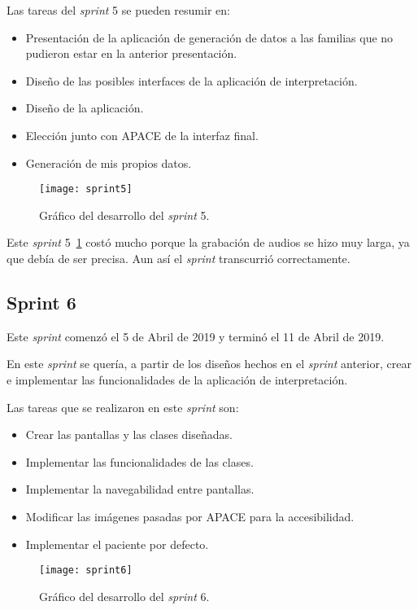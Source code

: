 Las tareas del \textit{sprint} 5 se pueden resumir en:
\begin{itemize}
	\item Presentación de la aplicación de generación de datos a las familias que no pudieron estar en la anterior presentación.
	\item Diseño de las posibles interfaces de la aplicación de interpretación.
	\item Diseño de la aplicación.
	\item Elección junto con APACE de la interfaz final.
	\item Generación de mis propios datos.
\end{itemize}

\begin{figure}
	\centering
	\texttt{[image: sprint5]}
	\caption{Gráfico del desarrollo del \textit{sprint} 5.}
	\label{fig:sprint5}
\end{figure}

Este \textit{sprint} 5~\ref{fig:sprint5} costó mucho porque la grabación de audios se hizo muy larga, ya que debía de ser precisa. Aun así el \textit{sprint} transcurrió correctamente.

\subsection{Sprint 6}
Este \textit{sprint} comenzó el 5 de Abril de 2019 y terminó el 11 de Abril de 2019.

En este \textit{sprint} se quería, a partir de los diseños hechos en el \textit{sprint} anterior, crear e implementar las funcionalidades de la aplicación de interpretación.

Las tareas que se realizaron en este \textit{sprint} son:
\begin{itemize}
	\item Crear las pantallas y las clases diseñadas.
	\item Implementar las funcionalidades de las clases.
	\item Implementar la navegabilidad entre pantallas.
	\item Modificar las imágenes pasadas por APACE para la accesibilidad.
	\item Implementar el paciente por defecto.
\end{itemize}

\begin{figure}
	\centering
	\texttt{[image: sprint6]}
	\caption{Gráfico del desarrollo del \textit{sprint} 6.}
	\label{fig:sprint6}
\end{figure}

